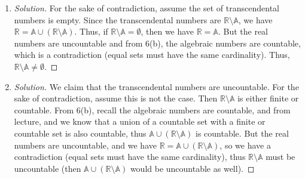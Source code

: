 \documentclass{article}
\newcommand{\N}{{\mathbb N}}
\newcommand{\R}{{\mathbb R}}
\begin{document}
\begin{enumerate}
\begin{proof}[Solution]
	with integer coefficients (where $i\in\N$, since the polynomials are countable by 6(a)),
	then we have
	\[
		\mathbb{A} = \bigcup_{i\in\N}a_i
	\]
	But note that this is a countable union of finite sets,
	which from the Corollary to Theorem 2.12 from Rudin,
	means that $\mathbb{A}$ must be finite or countable as well.
	In other words, $\mathbb{A} \leq \N$.
	But $\N \subset \mathbb{A}$ (consider the polynomials $p(x) = x-a$,
	$a \in \N$),
	and so there is a simple injection from $\N to \mathbb{A}$ ($\phi(x) = x$)
	thus $\N \leq \mathbb{A}$.
	Then, by the Schroeder Bernstein Theorem, $|\mathbb{A}| = |\N|$,
	which means $\mathbb{A}$ is countable.
\end{proof}
\item \begin{proof}[Solution]\let\qed\relax
	For the sake of contradiction, assume the set of transcendental numbers is empty.
	Since the transcendental numbers are $\R \setminus \mathbb{A}$,
	we have $\R = \mathbb{A} \cup \left(\R \setminus \mathbb{A}\right)$.
	Thus, if $\R \setminus \mathbb{A} = \emptyset$,
	then we have $\R = \mathbb{A}$.
	But the real numbers are uncountable and from 6(b),
	the algebraic numbers are countable, which is a contradiction
	(equal sets must have the same cardinality).
	Thus, $\R \setminus \mathbb{A} \neq \emptyset$.
\end{proof}
\item \begin{proof}[Solution]\let\qed\relax
	We claim that the transcendental numbers are uncountable.
	For the sake of contradiction, assume this is not the case.
	Then $\R \setminus \mathbb{A}$ is either finite or countable.
	From 6(b), recall the algebraic numbers are countable,
	and from lecture, and we know that a union of a countable set
	with a finite or countable set is also countable,
	thus $\mathbb{A} \cup (\R \setminus \mathbb{A})$ is countable.
	But the real numbers are uncountable,
	and we have $\R = \mathbb{A} \cup \left(\R \setminus \mathbb{A}\right)$,
	so we have a contradiction (equal sets must have the same cardinality),
	thus $\R \setminus \mathbb{A}$ must be uncountable
	(then $\mathbb{A} \cup (\R \setminus \mathbb{A})$ would be uncountable as well).
\end{proof}
\end{enumerate}
\clearpage
\end{document}
